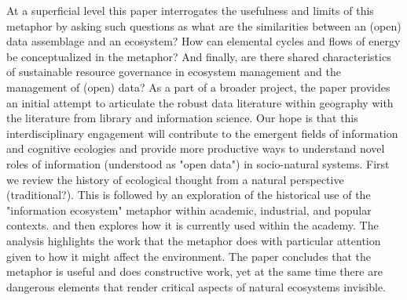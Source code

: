 At a superficial level this paper interrogates the usefulness and limits of this metaphor by asking such questions as what are the similarities between an (open) data assemblage \cite{kitchin_2014} and an ecosystem? How can elemental cycles and flows of energy be conceptualized in the metaphor? And finally, are there shared characteristics of sustainable resource governance in ecosystem management and the management of (open) data? As a part of a broader project, the paper provides an initial attempt to articulate the robust data literature within geography with the literature from library and information science. Our hope is that this interdisciplinary engagement will contribute to the emergent fields of information and cognitive ecologies and provide more productive ways to understand novel roles of information (understood as "open data") in socio-natural systems. First we review the history of ecological thought from a natural perspective (traditional?). This is followed by an exploration of the historical use of the "information ecosystem" metaphor within academic, industrial, and popular contexts. and then explores how it is currently used within the academy. The analysis highlights the work that the metaphor does with particular attention given to how it might affect the environment. The paper concludes that the metaphor is useful and does constructive work, yet at the same time there are dangerous elements that render critical aspects of natural ecosystems invisible.
